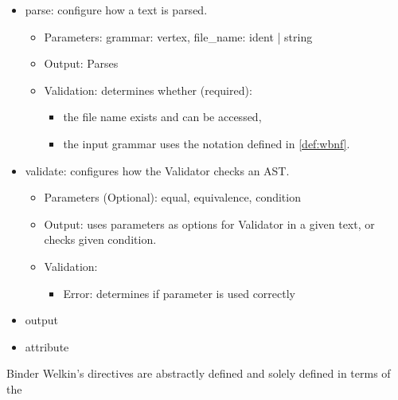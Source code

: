 \begin{itemize}
  \item parse: configure how a text is parsed.
  \begin{itemize}
    \item Parameters: grammar: vertex, file\_name: ident | string
    \item Output: Parses
    \item Validation: determines whether (required):
    \begin{itemize}
    \item the file name exists and can be accessed,
    \item the input grammar uses the notation defined in \ref{def:wbnf}.
    \end{itemize}
  \end{itemize}
  \item validate: configures how the Validator checks an AST.
  \begin{itemize}
    \item Parameters (Optional): equal, equivalence, condition
    \item Output: uses parameters as options for Validator in a given text, or checks given condition.
    \item Validation:
    \begin{itemize}
    \item Error: determines if parameter is used correctly
    \end{itemize}
  \end{itemize}
  \item output
  \item attribute
\end{itemize}

Binder Welkin's directives are abstractly defined and solely defined in terms of the






